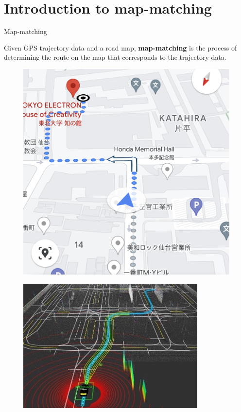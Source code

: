 \documentclass[aspectratio=169, bigfiles]{beamer}
\begin{document}
\section{Introduction to map-matching}
\begin{frame}{Map-matching}
    
Given GPS trajectory data and a road map, \textbf{map-matching} is the process of
determining the route on the map that corresponds to the trajectory data.\\ 
\begin{figure}
\centering
\begin{minipage}{.5\textwidth}
\centering
  \includegraphics[scale=.1]{googlemaps.png}
  \label{fig:test1}
\end{minipage}%
\begin{minipage}{.5\textwidth}
\centering
  \includegraphics[scale=.48]{selfdriving.jpeg}
  \label{fig:test2}
\end{minipage}
\end{figure}
\end{frame}
\end{document}
